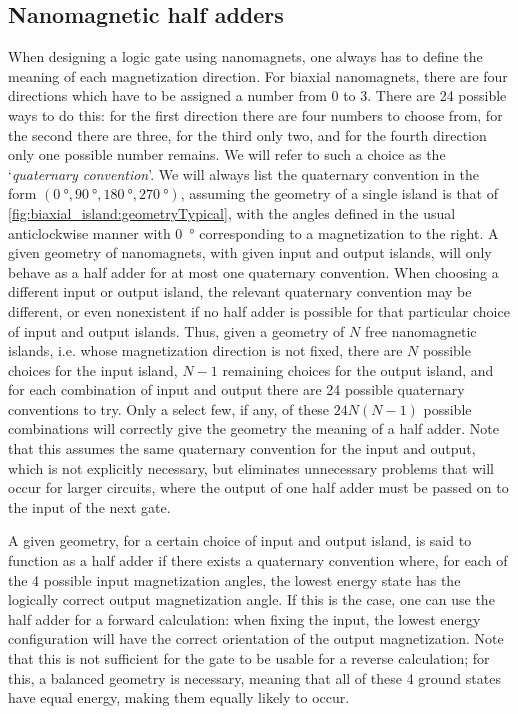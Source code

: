 \documentclass[11pt,a4paper,english,twoside]{article}
\begin{document}
\subsection{Nanomagnetic half adders}
When designing a logic gate using nanomagnets, one always has to define the meaning of each magnetization direction. For biaxial nanomagnets, there are four directions which have to be assigned a number from 0 to 3. There are 24 possible ways to do this: for the first direction there are four numbers to choose from, for the second there are three, for the third only two, and for the fourth direction only one possible number remains. We will refer to such a choice as the `\textit{quaternary convention}'. We will always list the quaternary convention in the form $(\SI{0}{\degree}, \SI{90}{\degree}, \SI{180}{\degree}, \SI{270}{\degree})$, assuming the geometry of a single island is that of \cref{fig:biaxial_island:geometryTypical}, with the angles defined in the usual anticlockwise manner with \SI{0}{\degree} corresponding to a magnetization to the right. A given geometry of nanomagnets, with given input and output islands, will only behave as a half adder for at most one quaternary convention. When choosing a different input or output island, the relevant quaternary convention may be different, or even nonexistent if no half adder is possible for that particular choice of input and output islands. Thus, given a geometry of $N$ free nanomagnetic islands, i.e. whose magnetization direction is not fixed, there are $N$ possible choices for the input island, $N-1$ remaining choices for the output island, and for each combination of input and output there are 24 possible quaternary conventions to try. Only a select few, if any, of these $24N(N-1)$ possible combinations will correctly give the geometry the meaning of a half adder. Note that this assumes the same quaternary convention for the input and output, which is not explicitly necessary, but eliminates unnecessary problems that will occur for larger circuits, where the output of one half adder must be passed on to the input of the next gate. \par
A given geometry, for a certain choice of input and output island, is said to function as a half adder if there exists a quaternary convention where, for each of the 4 possible input magnetization angles, the lowest energy state has the logically correct output magnetization angle. If this is the case, one can use the half adder for a forward calculation: when fixing the input, the lowest energy configuration will have the correct orientation of the output magnetization. Note that this is not sufficient for the gate to be usable for a reverse calculation; for this, a balanced geometry is necessary, meaning that all of these 4 ground states have equal energy, making them equally likely to occur. \par
\end{document}
